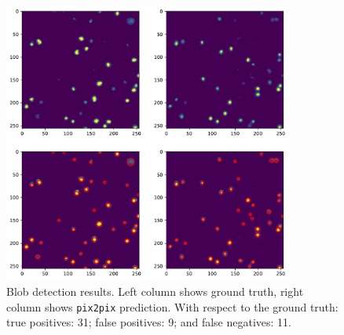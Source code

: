 \begin{figure}[h]
\centering
\includegraphics[width=0.85\textwidth]{img/blob_detection.pdf}
\caption{Blob detection results. Left column shows ground truth, right column shows \texttt{pix2pix} prediction. With respect to the ground truth: true positives: 31; false positives: 9; and false negatives: 11.}
\label{fig:blob_detection}
\end{figure}


